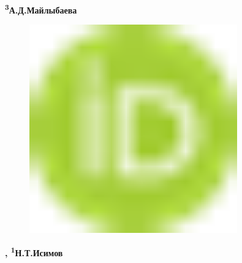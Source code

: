 {\bfseries \textsuperscript{3}А.Д.Майлыбаева}
\begin{figure}[H]
	\centering
	\includegraphics[width=0.8\textwidth]{media/ict/image16}
	\caption*{}
\end{figure}
{\bfseries ,
\textsuperscript{1}Н.Т.Исимов}


